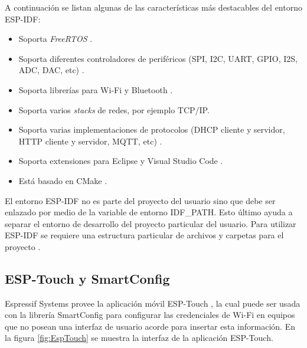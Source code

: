 A continuación se listan algunas de las características más destacables del entorno ESP-IDF:

\begin{itemize}
\item Soporta \textit{FreeRTOS} \citep{ESPIDF:FreeRTOS}.
\item Soporta diferentes controladores de periféricos (SPI, I2C, UART, GPIO, I2S, ADC, DAC, etc) \citep{ESPIDF:PER}.
\item Soporta librerías para Wi-Fi \citep{ESPIDF:WiFi} y Bluetooth \citep{ESPIDF:bluetooth}.
\item Soporta varios \textit{stacks} de redes, por ejemplo TCP/IP.
\item Soporta varias implementaciones de protocolos (DHCP cliente y servidor, HTTP cliente y servidor, MQTT, etc) \citep{ESPIDF:PRO}.
\item Soporta extensiones para Eclipse \citep{ESPIDF:ECLIPSE} y Visual Studio Code \citep{ESPIDF:VC}.
\item Está basado en CMake \citep{ESPIDF:CMake}.
\end{itemize}

El entorno ESP-IDF no es parte del proyecto del usuario sino que debe ser enlazado por medio de la variable de entorno IDF\_PATH. Esto último ayuda a separar el entorno de desarrollo del proyecto particular del usuario. Para utilizar ESP-IDF se requiere una estructura particular de archivos y carpetas para el proyecto \citep{ESPIDF:CMake_2}. 

\subsection{ESP-Touch y SmartConfig}
\label{sec:ESPTouch}

Espressif Systems provee la aplicación móvil ESP-Touch \citep{ESPTOUCH}, la cual puede ser usada con la librería SmartConfig \citep{SMARTCONFIG} para configurar las credenciales de Wi-Fi en equipos que no posean una interfaz de usuario acorde para insertar esta información. En la figura \ref{fig:EspTouch} se muestra la interfaz de la aplicación ESP-Touch.

